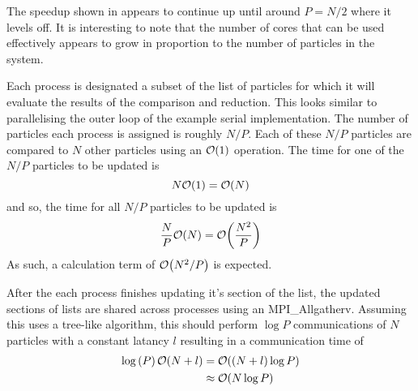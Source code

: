 %

%
%
\begin{figure}[!h]
    
    \caption{
        \vZeroSpeedupCaption
            {\replicateddata{}}
            {\pairoperation{}}
    }
    \label{fig:v0_replicated_data_pair_operation_speedups}
\end{figure}


\vZeroSpeedupExplanation
    {}
    {\replicateddata{}}
    {\pairoperation{}}

The speedup shown in 
appears to continue up until around $P = N/2$ where it levels
off.
%
It is interesting to note that the number of cores that can be
used effectively appears to grow in proportion to the number of particles
in the system.

%
Each process is designated a subset of the list of particles for which
it will evaluate the results of the comparison and reduction.
%
This looks similar to parallelising the outer loop of the example
serial implementation.
%
The number of particles each process is assigned is roughly $N/P$.
%
Each of these $N/P$ particles are compared to $N$ other particles
using an $\mathcal{O}{\left({ 1 }\right)}$ operation.
%
The time for one of the $N/P$ particles to be updated is
\begin{equation}
    N\mathcal{O}{\left({ 1 }\right)} = \mathcal{O}{\left({ N }\right)}
\end  {equation}
and so, the time for all $N/P$ particles to be updated is
\begin{equation}
    \frac{N}{P}\mathcal{O}{\left({ N }\right)} = \mathcal{O}{\left({ \frac{N^2}{P} }\right)}
\end  {equation}
As such, a calculation term of $\mathcal{O}{\left({ N^2/P }\right)}$ is expected.

%
After the each process finishes updating it's section of the list,
the updated sections of lists are shared across processes using
an MPI\_Allgatherv.
Assuming this uses a tree-like algorithm, this should perform
$\log{P}$ communications of $N$ particles with a constant latancy $l$
resulting in a communication time of
\begin{equation}
    \begin{split}
        \log{(P)}\,\mathcal{O}{\left({ N + l }\right)}
            &= \mathcal{O}{\left({ (N+l)\log{P} }\right)} \\
            &\approx{} \mathcal{O}{\left({ N\log{P} }\right)}
    \end{split}
\end{equation}

